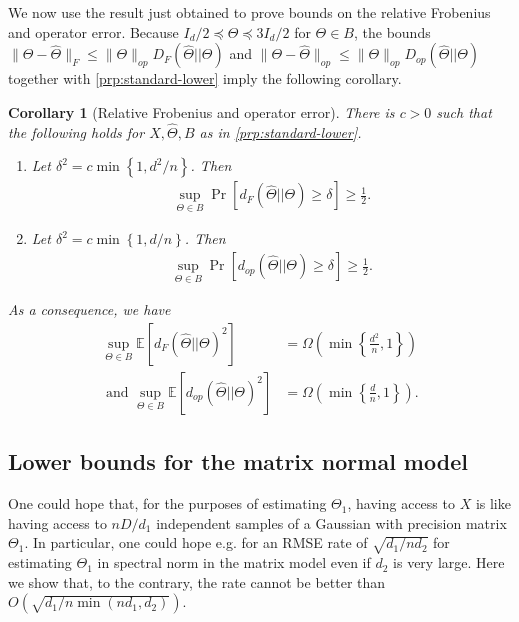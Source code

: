 \documentclass[aos]{imsart}
\newtheorem{corollary}[theorem]{Corollary}
\theoremstyle{definition}
\numberwithin{equation}{section}
\newcommand{\htheta}{\widehat{\Theta}}
\newcommand{\E}{\mathbb{E}}
\begin{document}
We now use the result just obtained to prove bounds on the relative Frobenius and operator error. Because $I_d/2 \preceq \Theta \preceq 3I_d/2$ for $\Theta \in B$, the bounds $\|\Theta - \htheta\|_F \leq \|\Theta\|_{op} D_F(\htheta|| \Theta)$ and $\|\Theta - \htheta\|_{op} \leq \|\Theta\|_{op} D_{op}(\htheta|| \Theta)$ together with \cref{prp:standard-lower} imply the following corollary.
\begin{corollary}[Relative Frobenius and operator error]\label{prp:relative-lower}
There is $c > 0$ such that the following holds for $X, \htheta, B$ as in \cref{prp:standard-lower}.
\begin{enumerate}
\item Let $\delta^2 = c\min \left\{1,d^2/n\right\}$. Then
\begin{align}
\sup_{\Theta \in B} \Pr\left[ d_F(\htheta|| \Theta)  \geq \delta\right] \geq \frac{1}{2}.\label{eq:df-lower}
\end{align}
\item Let $\delta^2 = c\min \left\{1,d/n\right\}$. Then
 \begin{align}
\sup_{\Theta \in B} \Pr\left[ d_{op}(\htheta|| \Theta) \geq \delta\right] \geq \frac{1}{2}. \label{eq:dop-lower}
\end{align}
\end{enumerate}
As a consequence, we have 
\begin{align*}\sup_{\Theta \in B}\E[d_F(\htheta|| \Theta)^2] &=\Omega\left( \min \left\{\frac{d^2}{n},1\right\}\right)\\
\text{ and } \sup_{\Theta \in B}\E[d_{op}(\htheta|| \Theta)^2] &= \Omega\left( \min \left\{\frac{d}{n},1\right\}\right).\end{align*}

\end{corollary}





\subsection{Lower bounds for the matrix normal model}
One could hope that, for the purposes of estimating $\Theta_1$, having access to $X$ is like having access to $n D/d_1$ independent samples of a Gaussian with precision matrix $\Theta_1$. In particular, one could hope e.g. for an RMSE rate of $\sqrt{ d_1/ n d_2}$ for estimating $\Theta_1$ in spectral norm in the matrix model even if $d_2$ is very large. Here we show that, to the contrary, the rate cannot be better than $O(\sqrt{d_1/ n \min(n d_1, d_2)})$. 
\end{document}
